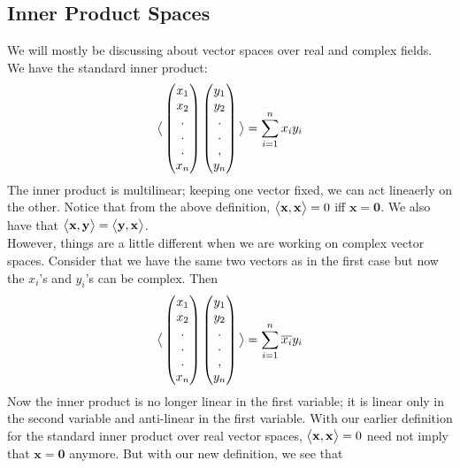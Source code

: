 \documentclass{article}
\begin{document}
\subsection*{Inner Product Spaces}
We will mostly be discussing about vector spaces over real and complex fields. We have the standard inner product:
$$
\big{<}
\begin{pmatrix}
    x_1\\
    x_2\\
    .\\
    .\\
    .\\
    x_n
\end{pmatrix}
\begin{pmatrix}
    y_1\\
    y_2\\
    .\\
    .\\
    ,\\
    y_n
\end{pmatrix}
\big{>}
=\sum_{i=1}^{n}x_i y_i
$$
The inner product is multilinear; keeping one vector fixed, we can act lineaerly on the other.
Notice that from the above definition, $\big{<}\mathbf{x},\mathbf{x}\big{>}=0$ iff $\mathbf{x}=\mathbf{0}$.
We also have that $\big{<}\mathbf{x},\mathbf{y}\big{>}=\big{<}\mathbf{y},\mathbf{x}\big{>}$.\\
However, things are a little different when we are working on complex vector spaces.
Consider that we have the same two vectors as in the first case but now the $x_i$'s and $y_i$'s can be complex. Then 
$$
\big{<}
\begin{pmatrix}
    x_1\\
    x_2\\
    .\\
    .\\
    .\\
    x_n
\end{pmatrix}
\begin{pmatrix}
    y_1\\
    y_2\\
    .\\
    .\\
    ,\\
    y_n
\end{pmatrix}
\big{>}
=\sum_{i=1}^{n}\overline{x_i} y_i
$$
Now the inner product is no longer linear in the first variable; it is linear only in the second variable and anti-linear in the first variable.
With our earlier definition for the standard inner product over real vector spaces, $\big{<}\mathbf{x},\mathbf{x}\big{>}=0$ need not imply that $\mathbf{x}=\mathbf{0}$ anymore. But with our new definition, we see that
\end{document}
